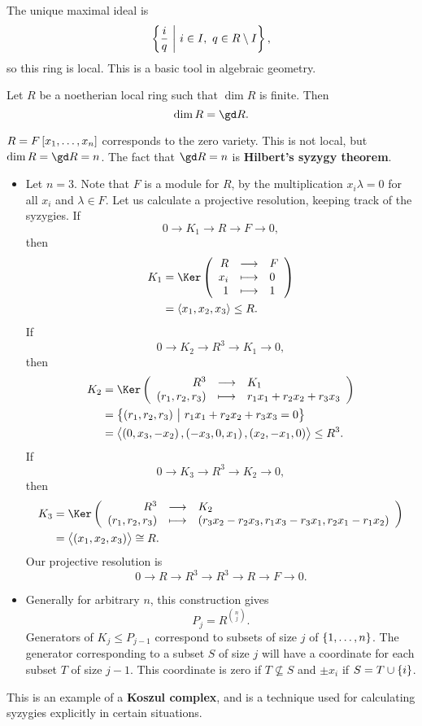 The unique maximal ideal is
$$ \cbr{\dfrac{i}{q} \st i \in I, \ q \in R \setminus I}, $$
so this ring is local. This is a basic tool in algebraic geometry.

\begin{theorem}[Serre]
Let $ R $ be a noetherian local ring such that $ \dim R $ is finite. Then
$$ \dim R = \gd R. $$
\end{theorem}

\begin{example*}
$ R = F\sbr{x_1, \dots, x_n} $ corresponds to the zero variety. This is not local, but $ \dim R = \gd R = n $. The fact that $ \gd R = n $ is \textbf{Hilbert's syzygy theorem}.
\begin{itemize}
\item Let $ n = 3 $. Note that $ F $ is a module for $ R $, by the multiplication $ x_i\lambda = 0 $ for all $ x_i $ and $ \lambda \in F $. Let us calculate a projective resolution, keeping track of the syzygies. If
$$ 0 \to K_1 \to R \to F \to 0, $$
then
\begin{align*}
K_1
& = \Ker \br{\functions{R}{F}{x_i}{0}{1}{1}} \\
& = \abr{x_1, x_2, x_3}
\le R.
\end{align*}
If
$$ 0 \to K_2 \to R^3 \to K_1 \to 0, $$
then
\begin{align*}
K_2
& = \Ker \br{\function{R^3}{K_1}{\br{r_1, r_2, r_3}}{r_1x_1 + r_2x_2 + r_3x_3}} \\
& = \cbr{\br{r_1, r_2, r_3} \st r_1x_1 + r_2x_2 + r_3x_3 = 0} \\
& = \abr{\br{0, x_3, -x_2}, \br{-x_3, 0, x_1}, \br{x_2, -x_1, 0}}
\le R^3.
\end{align*}
If
$$ 0 \to K_3 \to R^3 \to K_2 \to 0, $$
then
\begin{align*}
K_3
& = \Ker \br{\function{R^3}{K_2}{\br{r_1, r_2, r_3}}{\br{r_3x_2 - r_2x_3, r_1x_3 - r_3x_1, r_2x_1 - r_1x_2}}} \\
& = \abr{\br{x_1, x_2, x_3}}
\cong R.
\end{align*}
Our projective resolution is
$$ 0 \to R \to R^3 \to R^3 \to R \to F \to 0. $$
\item Generally for arbitrary $ n $, this construction gives
$$ P_j = R^{\binom{n}{j}}. $$
Generators of $ K_j \le P_{j - 1} $ correspond to subsets of size $ j $ of $ \cbr{1, \dots, n} $. The generator corresponding to a subset $ S $ of size $ j $ will have a coordinate for each subset $ T $ of size $ j - 1 $. This coordinate is zero if $ T \not\subseteq S $ and $ \pm x_i $ if $ S = T \cup \cbr{i} $.
\end{itemize}
This is an example of a \textbf{Koszul complex}, and is a technique used for calculating syzygies explicitly in certain situations.
\end{example*}

